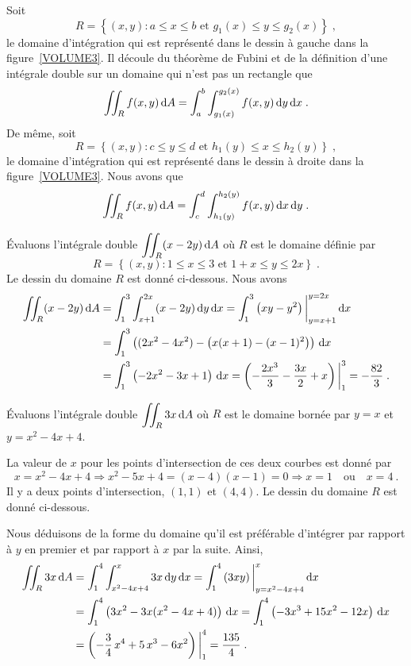 {Soit
\[
R = \left\{ (x,y) : a\leq x \leq b \text{ et } g_1(x) \leq y \leq
g_2(x) \right\} \; ,
\]
le domaine d'intégration qui est représenté dans le dessin à gauche dans
la figure~\ref{VOLUME3}.  Il découle du théorème de Fubini et de la définition
d'une intégrale double sur un domaine qui n'est pas un rectangle que
\[
\iint_R f(x,y) \,\mathrm{d}A = \int_a^b \int_{g_1(x)}^{g_2(x)} f(x,y) \,\mathrm{d}y \,\mathrm{d}x
\; .
\]
De même, soit
\[
R = \left\{ (x,y) : c\leq y \leq d \text{ et } h_1(y) \leq x \leq
h_2(y) \right\} \; ,
\]
le domaine d'intégration qui est représenté dans le dessin à droite dans la
figure~\ref{VOLUME3}.  Nous avons que
\[
\iint_R f(x,y) \,\mathrm{d}A = \int_c^d \int_{h_1(y)}^{h_2(y)} f(x,y) \,\mathrm{d}x \,\mathrm{d}y
\; .
\]


\begin{egg}
Évaluons l'intégrale double $\displaystyle \iint_R (x-2y) \,\mathrm{d}A$
où $R$ est le domaine définie par
\[
R = \left\{ (x,y) : 1 \leq x \leq 3 \text{ et }
1+x \leq y \leq 2x \right\} \; .
\]
Le dessin du domaine $R$ est donné ci-dessous.
Nous avons
\begin{align*}
\iint_R (x-2y) \,\mathrm{d}A &= \int_1^3 \int_{x+1}^{2x} (x-2y) \,\mathrm{d}y\,\mathrm{d}x
= \int_1^3 \left(xy-y^2\right)\bigg|_{y=x+1}^{y=2x} \,\mathrm{d}x \\
&= \int_1^3 \left( (2x^2-4x^2) - \left(x(x+1)-(x-1)^2\right) \right)\,\mathrm{d}x \\
&= \int_1^3 \left( -2x^2 - 3 x + 1\right) \,\mathrm{d}x
= \left( -\frac{2x^3}{3} - \frac{3x}{2} + x\right)\bigg|_1^3
= - \frac{82}{3} \; .
\end{align*}
\end{egg}

\begin{egg}
Évaluons l'intégrale double $\displaystyle \iint_R 3x \,\mathrm{d}A$
où $R$ est le domaine bornée par $y=x$ et $y=x^2-4x+4$.

La valeur de $x$ pour les points d'intersection de ces deux courbes
est donné par
\[
  x = x^2-4x+4 \Rightarrow x^2-5x+4 = (x-4)(x-1) = 0
  \Rightarrow x=1 \quad \text{ou} \quad x = 4 \ .
\]
Il y a deux points d'intersection, $(1,1)$ et $(4,4)$.  Le dessin
du domaine $R$ est donné ci-dessous.

Nous déduisons de la forme du domaine qu'il est préférable d'intégrer par
rapport à $y$ en premier et par rapport à $x$ par la suite.  Ainsi,
\begin{align*}
\iint_R 3x \,\mathrm{d}A &= \int_1^4 \int_{x^2-4x+4}^{x} 3x \,\mathrm{d}y\,\mathrm{d}x
= \int_1^4 \left( 3xy \right)\bigg|_{y=x^2-4x+4}^{x} \,\mathrm{d}x \\
&= \int_1^4 \left( 3x^2 - 3x(x^2-4x+4) \right)\,\mathrm{d}x
= \int_1^4 \left( -3x^3 +15 x^2 -12x \right) \,\mathrm{d}x \\
&= \left( -\frac{3}{4}\, x^4 + 5\, x^3 - 6x^2\right)\bigg|_1^4
= \frac{135}{4} \; .
\end{align*}
\end{egg}

}
